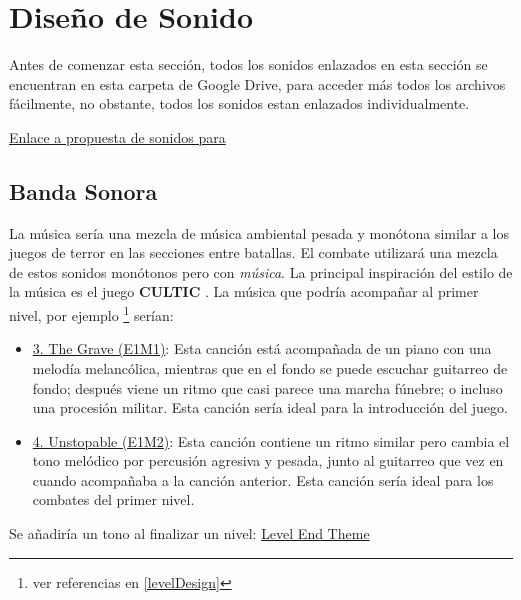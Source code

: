 {
            }

\newpage

\section{Diseño de Sonido}
    Antes de comenzar esta sección, todos los sonidos enlazados en esta sección se encuentran en esta carpeta de Google Drive, para acceder más todos los archivos fácilmente, no obstante, todos los sonidos estan enlazados individualmente.
        \begin{center}
            \href{https://drive.google.com/open?id=13Drehn-OJeRZ-eS3PpO_D1z_Fl79qpGu&usp=drive_fs}{Enlace a propuesta de sonidos para \gameTitle}
        \end{center}
    \subsection{Banda Sonora} \label{ost}
        La música sería una mezcla de música ambiental pesada y monótona similar a los juegos de terror en las secciones entre batallas. El combate utilizará una mezcla de estos sonidos monótonos pero con \textit{música}. La principal inspiración del estilo de la música es el juego \textbf{\textbf{CULTIC}} \cite{cultic2022} \cite{jasozz_cultic_2023}. La música que podría acompañar al primer nivel, por ejemplo \footnote{ver referencias en \ref{levelDesign}} serían:
            \begin{itemize}
                \item \href{https://youtu.be/LXxBT9cmWjI?si=1Fgiadgp8nBzD8x4&t=245}{3. The Grave (E1M1)}: Esta canción está acompañada de un piano con una melodía melancólica, mientras que en el fondo se puede escuchar guitarreo de fondo; después viene un ritmo que casi parece una marcha fúnebre; o incluso una procesión militar. Esta canción sería ideal para la introducción del juego.
                \item \href{https://youtu.be/LXxBT9cmWjI?si=d9kko76w1qNqges7&t=469}{4. Unstopable (E1M2)}: Esta canción contiene un ritmo similar pero cambia el tono melódico por percusión agresiva y pesada, junto al guitarreo que vez en cuando acompañaba a la canción anterior. Esta canción sería ideal para los combates del primer nivel.
            \end{itemize}
        Se añadiría un tono al finalizar un nivel: \href{https://www.youtube.com/watch?v=LXxBT9cmWjI&t=4407s}{Level End Theme}

